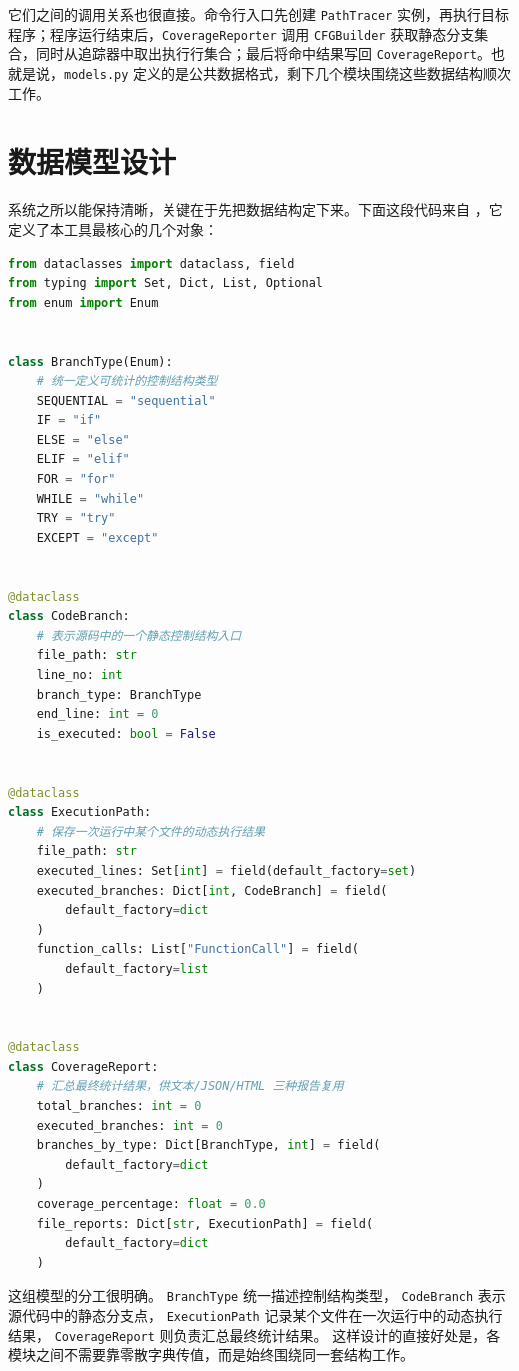 它们之间的调用关系也很直接。命令行入口先创建 \texttt{PathTracer} 实例，再执行目标程序；程序运行结束后，\texttt{CoverageReporter} 调用 \texttt{CFGBuilder} 获取静态分支集合，同时从追踪器中取出执行行集合；最后将命中结果写回 \texttt{CoverageReport}。也就是说，\texttt{models.py} 定义的是公共数据格式，剩下几个模块围绕这些数据结构顺次工作。

\section{数据模型设计}

系统之所以能保持清晰，关键在于先把数据结构定下来。下面这段代码来自 ，它定义了本工具最核心的几个对象：

\begin{lstlisting}[language=Python, caption={PathTracer 的核心数据模型}]
from dataclasses import dataclass, field
from typing import Set, Dict, List, Optional
from enum import Enum


class BranchType(Enum):
    # 统一定义可统计的控制结构类型
    SEQUENTIAL = "sequential"
    IF = "if"
    ELSE = "else"
    ELIF = "elif"
    FOR = "for"
    WHILE = "while"
    TRY = "try"
    EXCEPT = "except"


@dataclass
class CodeBranch:
    # 表示源码中的一个静态控制结构入口
    file_path: str
    line_no: int
    branch_type: BranchType
    end_line: int = 0
    is_executed: bool = False


@dataclass
class ExecutionPath:
    # 保存一次运行中某个文件的动态执行结果
    file_path: str
    executed_lines: Set[int] = field(default_factory=set)
    executed_branches: Dict[int, CodeBranch] = field(
        default_factory=dict
    )
    function_calls: List["FunctionCall"] = field(
        default_factory=list
    )


@dataclass
class CoverageReport:
    # 汇总最终统计结果，供文本/JSON/HTML 三种报告复用
    total_branches: int = 0
    executed_branches: int = 0
    branches_by_type: Dict[BranchType, int] = field(
        default_factory=dict
    )
    coverage_percentage: float = 0.0
    file_reports: Dict[str, ExecutionPath] = field(
        default_factory=dict
    )
\end{lstlisting}

这组模型的分工很明确。%
\texttt{BranchType} 统一描述控制结构类型，%
\texttt{CodeBranch} 表示源代码中的静态分支点，%
\texttt{ExecutionPath} 记录某个文件在一次运行中的动态执行结果，%
\texttt{CoverageReport} 则负责汇总最终统计结果。%
这样设计的直接好处是，各模块之间不需要靠零散字典传值，而是始终围绕同一套结构工作。

